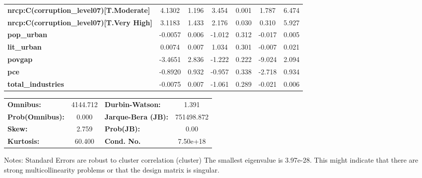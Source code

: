 \begin{center}
\begin{tabular}{lcccccc}
\textbf{nrcp:C(corruption\_level07)[T.Moderate]}                                                    &       4.1302  &        1.196     &     3.454  &         0.001        &        1.787    &        6.474     \\
\textbf{nrcp:C(corruption\_level07)[T.Very High]}                                                   &       3.1183  &        1.433     &     2.176  &         0.030        &        0.310    &        5.927     \\
\textbf{pop\_urban}                                                                                 &      -0.0057  &        0.006     &    -1.012  &         0.312        &       -0.017    &        0.005     \\
\textbf{lit\_urban}                                                                                 &       0.0074  &        0.007     &     1.034  &         0.301        &       -0.007    &        0.021     \\
\textbf{povgap}                                                                                     &      -3.4651  &        2.836     &    -1.222  &         0.222        &       -9.024    &        2.094     \\
\textbf{pce}                                                                                        &      -0.8920  &        0.932     &    -0.957  &         0.338        &       -2.718    &        0.934     \\
\textbf{total\_industries}                                                                          &      -0.0075  &        0.007     &    -1.061  &         0.289        &       -0.021    &        0.006     \\
\bottomrule
\end{tabular}
\begin{tabular}{lclc}
\textbf{Omnibus:}       & 4144.712 & \textbf{  Durbin-Watson:     } &     1.391   \\
\textbf{Prob(Omnibus):} &   0.000  & \textbf{  Jarque-Bera (JB):  } & 751498.872  \\
\textbf{Skew:}          &   2.759  & \textbf{  Prob(JB):          } &      0.00   \\
\textbf{Kurtosis:}      &  60.400  & \textbf{  Cond. No.          } &  7.50e+18   \\
\bottomrule
\end{tabular}
\end{center}

Notes: \newline
 [1] Standard Errors are robust to cluster correlation (cluster) \newline
 [2] The smallest eigenvalue is 3.97e-28. This might indicate that there are \newline
 strong multicollinearity problems or that the design matrix is singular.